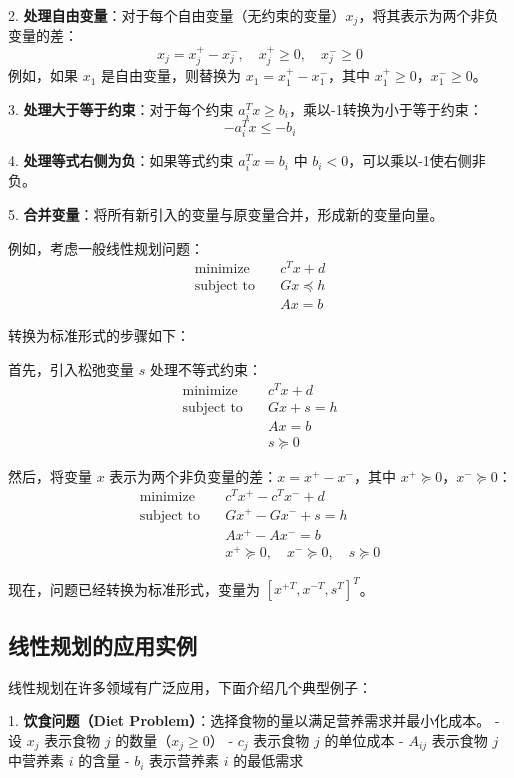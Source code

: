 \documentclass[12pt,a4paper]{book}
\begin{document}
2. \textbf{处理自由变量}：对于每个自由变量（无约束的变量）$x_j$，将其表示为两个非负变量的差：
   $$
   x_j = x_j^+ - x_j^-, \quad x_j^+ \geq 0, \quad x_j^- \geq 0
   $$
   例如，如果 $x_1$ 是自由变量，则替换为 $x_1 = x_1^+ - x_1^-$，其中 $x_1^+ \geq 0$，$x_1^- \geq 0$。

3. \textbf{处理大于等于约束}：对于每个约束 $a_i^T x \geq b_i$，乘以-1转换为小于等于约束：
   $$
   -a_i^T x \leq -b_i
   $$

4. \textbf{处理等式右侧为负}：如果等式约束 $a_i^T x = b_i$ 中 $b_i < 0$，可以乘以-1使右侧非负。

5. \textbf{合并变量}：将所有新引入的变量与原变量合并，形成新的变量向量。

例如，考虑一般线性规划问题：
$$
\begin{aligned}
\text{minimize} \quad & c^T x + d \\
\text{subject to} \quad & Gx \preceq h \\
& Ax = b
\end{aligned}
$$

转换为标准形式的步骤如下：

首先，引入松弛变量 $s$ 处理不等式约束：
$$
\begin{aligned}
\text{minimize} \quad & c^T x + d \\
\text{subject to} \quad & Gx + s = h \\
& Ax = b \\
& s \succeq 0
\end{aligned}
$$

然后，将变量 $x$ 表示为两个非负变量的差：$x = x^+ - x^-$，其中 $x^+ \succeq 0$，$x^- \succeq 0$：
$$
\begin{aligned}
\text{minimize} \quad & c^T x^+ - c^T x^- + d \\
\text{subject to} \quad & Gx^+ - Gx^- + s = h \\
& Ax^+ - Ax^- = b \\
& x^+ \succeq 0, \quad x^- \succeq 0, \quad s \succeq 0
\end{aligned}
$$

现在，问题已经转换为标准形式，变量为 $[x^{+T}, x^{-T}, s^T]^T$。

\subsection{线性规划的应用实例}

线性规划在许多领域有广泛应用，下面介绍几个典型例子：

1. \textbf{饮食问题（Diet Problem）}：选择食物的量以满足营养需求并最小化成本。
   - 设 $x_j$ 表示食物 $j$ 的数量（$x_j \geq 0$）
   - $c_j$ 表示食物 $j$ 的单位成本
   - $A_{ij}$ 表示食物 $j$ 中营养素 $i$ 的含量
   - $b_i$ 表示营养素 $i$ 的最低需求
   
\end{document}
